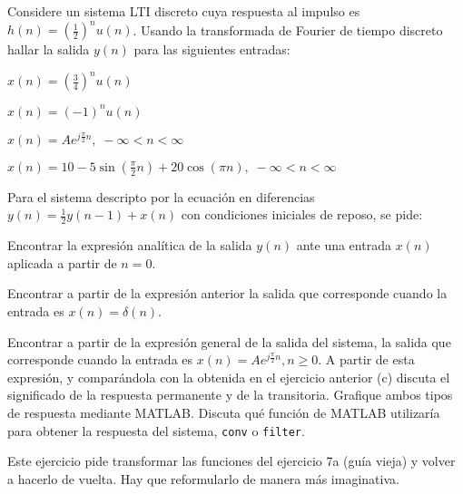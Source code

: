     \begin{ejercicio}
    Considere un sistema LTI discreto cuya respuesta al impulso es $h(n) = \left(\frac{1}{2}\right)^n u(n)$. Usando la transformada de Fourier de tiempo discreto hallar la salida $y(n)$ para las siguientes entradas:
    
    \inciso $x(n) = \left(\frac{3}{4}\right)^n u(n)$
    
    \inciso $x(n) = \left(-1\right)^n u(n)$
    
    \inciso $x(n) = A e^{j\frac{\pi}{2}n},\; -\infty < n < \infty$
    
    \inciso $x(n) = 10 - 5 \sin\left(\frac{\pi}{2} n\right) + 20 \cos(\pi n),\; -\infty < n < \infty$
    
    \end{ejercicio}
    
    \begin{ejercicio}
    Para el sistema descripto por la ecuación en diferencias $y(n) = \frac{1}{2} y(n-1) + x(n)$ con condiciones iniciales de reposo, se pide:
    
    \inciso Encontrar la expresión analítica de la salida $y(n)$ ante una entrada $x(n)$ aplicada a partir de $n = 0$.
    
    \inciso Encontrar a partir de la expresión anterior la salida que corresponde cuando la entrada es $x(n) = \delta(n)$. 
    
    \inciso Encontrar a partir de la expresión general de la salida del sistema, la salida que corresponde
    cuando la entrada es $x(n) = A e^{j\frac{\pi}{2}n}, n \geq 0$. A partir de esta expresión, y
    comparándola con la obtenida en el ejercicio anterior (c) discuta el significado de la respuesta permanente y de la transitoria. Grafique ambos tipos de respuesta mediante MATLAB. Discuta qué función de MATLAB utilizaría para obtener la respuesta del sistema, \texttt{conv} o \texttt{filter}.
    
    \end{ejercicio}
    
    \begin{ejercicio}
    Este ejercicio pide transformar las funciones del ejercicio 7a (guía vieja) y volver a hacerlo de vuelta. Hay que reformularlo de manera más imaginativa. 
    \end{ejercicio}